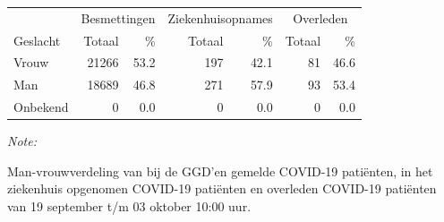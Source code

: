 \documentclass[
  english,
  man,floatsintext]{apa6}
\begin{document}
\begin{table}[H]
\centering\begingroup\fontsize{11}{13}\selectfont

\begin{threeparttable}
\begin{tabular}{lrrrrrr}
\toprule
\multicolumn{1}{c}{ } & \multicolumn{2}{c}{Besmettingen} & \multicolumn{2}{c}{Ziekenhuisopnames} & \multicolumn{2}{c}{Overleden} \\
\cmidrule(l{3pt}r{3pt}){2-3} \cmidrule(l{3pt}r{3pt}){4-5} \cmidrule(l{3pt}r{3pt}){6-7}
Geslacht & Totaal & \% & Totaal & \% & Totaal & \%\\
\midrule
Vrouw & 21266 & 53.2 & 197 & 42.1 & 81 & 46.6\\
Man & 18689 & 46.8 & 271 & 57.9 & 93 & 53.4\\
Onbekend & 0 & 0.0 & 0 & 0.0 & 0 & 0.0\\
\bottomrule
\end{tabular}
\begin{tablenotes}
\item \textit{Note: } 
\item Man-vrouwverdeling van bij de GGD’en gemelde COVID-19 patiënten, in het ziekenhuis opgenomen COVID-19 patiënten en overleden COVID-19 patiënten van 19 september t/m 03 oktober 10:00 uur.
\end{tablenotes}
\end{threeparttable}
\endgroup{}
\end{table}
\newpage
\end{document}
